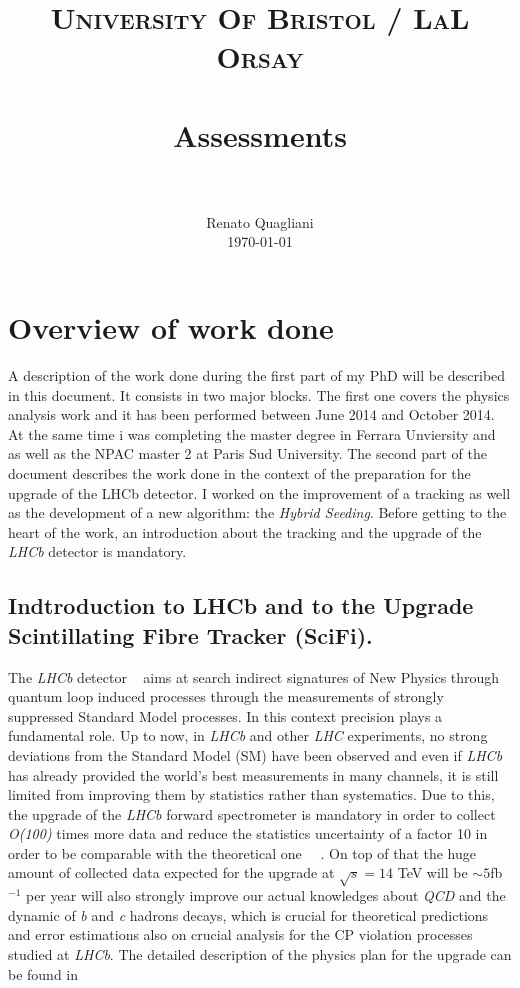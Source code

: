 \documentclass[paper=a4, fontsize=10pt]{scrartcl}
\title{
		\usefont{OT1}{bch}{b}{n}
		\normalfont \normalsize \textsc{University Of Bristol / LaL Orsay} \\ [25pt]
		\horrule{0.5pt} \\[0.4cm]
		\huge Assessments \\
		\horrule{2pt} \\[0.5cm]
}
\author{
		\normalfont 								\normalsize
        Renato Quagliani\\[-3pt]		\normalsize
        \today
}
\date{}
\numberwithin{equation}{section}		%
\numberwithin{figure}{section}			%
\numberwithin{table}{section}				%
\begin{document}
\maketitle
\section{Overview of work done}
A description of the work done during the first part of my PhD will be described in this document. It consists in two major blocks. The first one covers the physics analysis work and it has been performed between June 2014 and October 2014. At the same time i was completing the master degree in Ferrara Unviersity and as well as the NPAC master 2 at Paris Sud University. The second part of the document describes the work done in the context of the preparation for the upgrade of the LHCb detector. I worked on the improvement of a tracking as well as the development of a new algorithm: the \textit{Hybrid Seeding}.
Before getting to the heart of the work, an introduction about the tracking and the upgrade of the \textit{LHCb} detector is mandatory.
\subsection{Indtroduction to LHCb and to the Upgrade Scintillating Fibre Tracker (SciFi).}
The \textit{LHCb} detector ~\cite{Blake1} aims at search indirect signatures of New Physics through quantum loop induced processes through the measurements of strongly suppressed Standard Model processes.
In this context precision plays a fundamental role. 
Up to now, in \textit{LHCb} and other \textit{LHC} experiments, no strong deviations from the Standard Model (SM) have been observed and even if \textit{LHCb} has already provided the world's best measurements in many channels, it is still limited from improving them by statistics rather than systematics. Due to this, the upgrade of the \textit{LHCb} forward spectrometer is mandatory in order to collect \textit{O(100)} times more data and reduce the statistics uncertainty of a factor 10 in order to be comparable with the theoretical one ~\cite{Blake2}~\cite{Blake3}. On top of that the huge amount of collected data expected for the upgrade at $\sqrt{s} = 14$ TeV will be $\sim 5$fb$^{-1}$ per year  will also strongly improve our actual knowledges about \textit{QCD} and the dynamic of \textit{b} and \textit{c} hadrons decays, which is crucial for theoretical predictions and error estimations also on crucial analysis for the CP violation processes studied at \textit{LHCb}. The detailed description of the physics plan for the upgrade can be found in ~\cite{LetterIntent}
\end{document}
